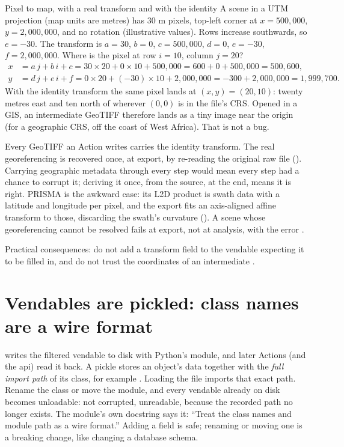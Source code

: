\begin{worked}[label={we:product:affine}]{Pixel to map, with a real transform and with the identity}
A scene in a UTM projection (map units are metres) has $30$ m pixels, top-left corner at
$x = 500{,}000$, $y = 2{,}000{,}000$, and no rotation (illustrative values\tagA). Rows increase
southwards, so $e = -30$. The transform is $a = 30$, $b = 0$, $c = 500{,}000$, $d = 0$,
$e = -30$, $f = 2{,}000{,}000$. Where is the pixel at row $i = 10$, column $j = 20$?
\begin{align*}
x &= a\,j + b\,i + c = 30 \times 20 + 0 \times 10 + 500{,}000 = 600 + 0 + 500{,}000 = 500{,}600,\\
y &= d\,j + e\,i + f = 0 \times 20 + (-30) \times 10 + 2{,}000{,}000 = -300 + 2{,}000{,}000 = 1{,}999{,}700.
\end{align*}
With the identity transform the same pixel lands at $(x, y) = (20, 10)$: twenty metres east and ten
north of wherever $(0,0)$ is in the file's CRS. Opened in a GIS, an intermediate GeoTIFF therefore
lands as a tiny image near the origin (for a geographic CRS, off the coast of West Africa). That is
not a bug.
\end{worked}

Every GeoTIFF an Action writes carries the identity transform. The real georeferencing is
recovered once, at export, by re-reading the original raw file (). Carrying
geographic metadata through every step would mean every step had a chance to corrupt it; deriving it
once, from the source, at the end, means it is right. PRISMA is the awkward case: its L2D product is
swath data with a latitude and longitude per pixel, and the export fits an axis-aligned
affine transform to those, discarding the swath's curvature (). A
scene whose georeferencing cannot be resolved fails at export, not at analysis, with the error
.

Practical consequences: do not add a transform field to the vendable expecting it to be filled in,
and do not trust the coordinates of an intermediate .

\section{Vendables are pickled: class names are a wire format}\label{sec:product:pickle}

 writes the filtered vendable to disk with Python's  module,
and later Actions (and the api) read it back. A pickle stores an object's data together with the
\emph{full import path} of its class, for example
. Loading the file imports that
exact path. Rename the class or move the module, and every vendable already on disk becomes
unloadable: not corrupted, unreadable, because the recorded path no longer exists. The module's own
docstring says it: ``Treat the class names and module path as a wire format.'' Adding a field is
safe; renaming or moving one is a breaking change, like changing a database schema.

